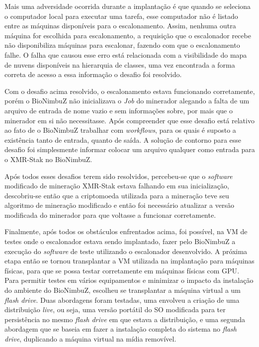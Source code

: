 Mais uma adversidade ocorrida durante a implantação é que quando se seleciona o computador local para executar uma tarefa, esse computador não é listado entre as máquinas disponíveis para o escalonamento. Assim, nenhuma outra máquina for escolhida para escalonamento, a requisição que o escalonador recebe não disponibiliza máquinas para escalonar, fazendo com que o escalonamento falhe. O falha que causou esse erro está relacionada com a visibilidade do mapa de nuvens disponíveis na hierarquia de classes, uma vez encontrada a forma correta de acesso a essa informação o desafio foi resolvido.

Com o desafio acima resolvido, o escalonamento estava funcionando corretamente, porém o BioNimbuZ não inicializava o \textit{Job} do minerador alegando a falta de um arquivo de entrada de nome vazio e sem informações sobre, por mais que o minerador em si não necessitasse. Após compreender que esse desafio está relativo ao fato de o BioNimbuZ trabalhar com \textit{workflows}, para os quais é suposto a existência tanto de entrada, quanto de saída. A solução de contorno para esse desafio foi simplesmente informar colocar um arquivo qualquer como entrada para o XMR-Stak no BioNimbuZ.

Após todos esses desafios terem sido resolvidos, percebeu-se que o \textit{software} modificado de mineração XMR-Stak estava falhando em sua inicialização, descobriu-se então que a criptomoeda utilizada para a mineração teve seu algoritmo de mineração modificado e então foi necessário atualizar a versão modificada do minerador para que voltasse a funcionar corretamente.

Finalmente, após todos os obstáculos enfrentados acima, foi possível, na \acrshort{VM} de testes onde o escalonador estava sendo implantado, fazer pelo BioNimbuZ a execução do \textit{software} de teste utilizando o escalonador desenvolvido. A próxima etapa então se tornou transplantar a \acrshort{VM} utilizada na implantação para máquinas físicas, para que se possa testar corretamente em máquinas físicas com \acrshort{GPU}. Para permitir testes em vários equipamentos e minimizar o impacto da instalação do ambiente do BioNimbuZ, escolheu se transplantar a máquina virtual a um \textit{flash drive}. Duas abordagens foram testadas, uma envolveu a criação de uma distribuição \textit{live}, ou seja, uma versão portátil do \acrshort{SO} modificada para ter persistência no mesmo \textit{flash drive} em que estava a distribuição, e uma segunda abordagem que se baseia em fazer a instalação completa do sistema no \textit{flash drive}, duplicando a máquina virtual na mídia removível.

